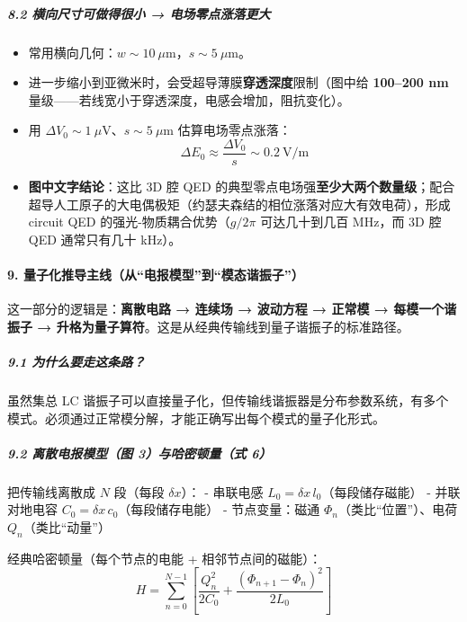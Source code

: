 \documentclass[12pt,a4paper,oneside]{ctexbook}
\providecommand{\tightlist}{%
  \setlength{\itemsep}{0pt}\setlength{\parskip}{0pt}}
\let\oldparagraph\paragraph
\renewcommand{\paragraph}[1]{\oldparagraph{#1}\mbox{}}
\let\oldsubparagraph\subparagraph
\renewcommand{\subparagraph}[1]{\oldsubparagraph{#1}\mbox{}}
\begin{document}
\subparagraph{8.2 横向尺寸可做得很小 →
电场零点涨落更大}\label{ux6a2aux5411ux5c3aux5bf8ux53efux505aux5f97ux5f88ux5c0f-ux7535ux573aux96f6ux70b9ux6da8ux843dux66f4ux5927}

\begin{itemize}
\tightlist
\item
  常用横向几何：\(w\sim 10~\mu\text{m}\)，\(s\sim 5~\mu\text{m}\)。
\item
  进一步缩小到亚微米时，会受超导薄膜\textbf{穿透深度}限制（图中给
  \textbf{100--200 nm}
  量级------若线宽小于穿透深度，电感会增加，阻抗变化）。
\item
  用 \(\Delta V_0\sim 1~\mu\text{V}\)、\(s\sim 5~\mu\text{m}\)
  估算电场零点涨落：
  \[\Delta E_0\approx \frac{\Delta V_0}{s}\sim 0.2~\text{V/m}\]
\item
  \textbf{图中文字结论}：这比 3D 腔 QED
  的典型零点电场强\textbf{至少大两个数量级}；配合超导人工原子的大电偶极矩（约瑟夫森结的相位涨落对应大有效电荷），形成
  circuit QED 的强光-物质耦合优势（\(g/2\pi\) 可达几十到几百 MHz，而 3D
  腔 QED 通常只有几十 kHz）。
\end{itemize}


\paragraph{9.
量子化推导主线（从``电报模型''到``模态谐振子''）}\label{ux91cfux5b50ux5316ux63a8ux5bfcux4e3bux7ebfux4eceux7535ux62a5ux6a21ux578bux5230ux6a21ux6001ux8c10ux632fux5b50}

这一部分的逻辑是：\textbf{离散电路 → 连续场 → 波动方程 → 正常模 →
每模一个谐振子 →
升格为量子算符}。这是从经典传输线到量子谐振子的标准路径。

\subparagraph{9.1
为什么要走这条路？}\label{ux4e3aux4ec0ux4e48ux8981ux8d70ux8fd9ux6761ux8def}

虽然集总 LC
谐振子可以直接量子化，但传输线谐振器是分布参数系统，有多个模式。必须通过正常模分解，才能正确写出每个模式的量子化形式。

\subparagraph{9.2 离散电报模型（图 3）与哈密顿量（式
6）}\label{ux79bbux6563ux7535ux62a5ux6a20ux578bux56fe-3ux4e0eux54c8ux5bc6ux987fux91cfux5f0f-6}

把传输线离散成 \(N\) 段（每段 \(\delta x\)）： - 串联电感
\(L_0=\delta x\,l_0\)（每段储存磁能） - 并联对地电容
\(C_0=\delta x\,c_0\)（每段储存电能） - 节点变量：磁通
\(\Phi_n\)（类比``位置''）、电荷 \(Q_n\)（类比``动量''）

经典哈密顿量（每个节点的电能 + 相邻节点间的磁能）：
\[H=\sum_{n=0}^{N-1}\left[\frac{Q_n^2}{2C_0}+\frac{(\Phi_{n+1}-\Phi_n)^2}{2L_0}\right]\]
\end{document}
